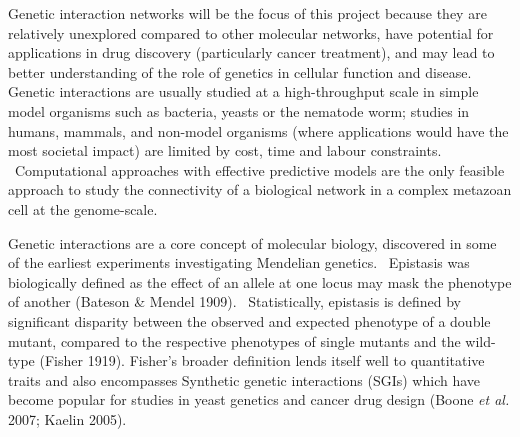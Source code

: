 Genetic interaction networks will be the focus of this project because
they are relatively unexplored compared to other molecular networks,
have potential for applications in drug discovery (particularly cancer
treatment), and may lead to better understanding of the role of
genetics in cellular function and disease. Genetic interactions are
usually studied at a high-throughput scale in simple model organisms
such as bacteria, yeasts or the nematode worm; studies in humans,
mammals, and non-model organisms (where applications would have the
most societal impact) are limited by cost, time and labour constraints.
\ Computational approaches with effective predictive models are the
only feasible approach to study the connectivity of a biological
network in a complex metazoan cell at the genome-scale.


Genetic interactions are a core concept of molecular biology, discovered
in some of the earliest experiments investigating Mendelian genetics.
\ Epistasis was biologically defined as the effect of an allele at one
locus may mask the phenotype of another (Bateson \& Mendel 1909).
\ Statistically, epistasis is defined by significant disparity between
the observed and expected phenotype of a double mutant, compared to the
respective phenotypes of single mutants and the wild-type (Fisher
1919). Fisher{\textquoteright}s broader definition lends itself well
to quantitative traits and also encompasses Synthetic genetic
interactions (SGIs) which have become popular for studies in yeast
genetics and cancer drug design (Boone\textit{ et al.} 2007; Kaelin
2005). 


